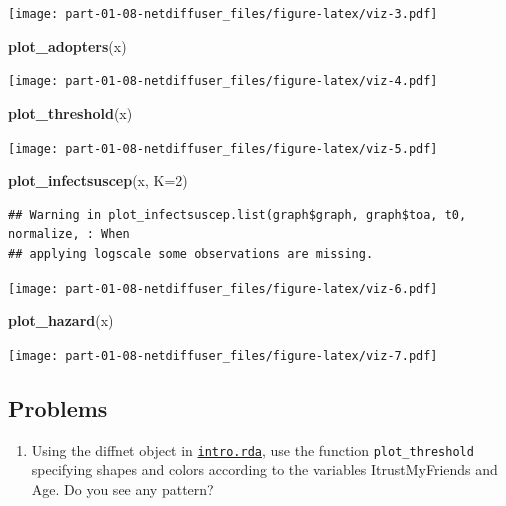 \documentclass[]{book}
\newenvironment{Shaded}{\begin{snugshade}}{\end{snugshade}}
\newcommand{\DataTypeTok}[1]{\textcolor[rgb]{0.13,0.29,0.53}{#1}}
\newcommand{\DecValTok}[1]{\textcolor[rgb]{0.00,0.00,0.81}{#1}}
\newcommand{\KeywordTok}[1]{\textcolor[rgb]{0.13,0.29,0.53}{\textbf{#1}}}
\newcommand{\NormalTok}[1]{#1}
\providecommand{\tightlist}{%
  \setlength{\itemsep}{0pt}\setlength{\parskip}{0pt}}
\begin{document}
\texttt{[image: part-01-08-netdiffuser\_files/figure-latex/viz-3.pdf]}

\begin{Shaded}
\begin{Highlighting}[]
\KeywordTok{plot_adopters}\NormalTok{(x)}
\end{Highlighting}
\end{Shaded}

\texttt{[image: part-01-08-netdiffuser\_files/figure-latex/viz-4.pdf]}

\begin{Shaded}
\begin{Highlighting}[]
\KeywordTok{plot_threshold}\NormalTok{(x)}
\end{Highlighting}
\end{Shaded}

\texttt{[image: part-01-08-netdiffuser\_files/figure-latex/viz-5.pdf]}

\begin{Shaded}
\begin{Highlighting}[]
\KeywordTok{plot_infectsuscep}\NormalTok{(x, }\DataTypeTok{K=}\DecValTok{2}\NormalTok{)}
\end{Highlighting}
\end{Shaded}

\begin{verbatim}
## Warning in plot_infectsuscep.list(graph$graph, graph$toa, t0, normalize, : When
## applying logscale some observations are missing.
\end{verbatim}

\texttt{[image: part-01-08-netdiffuser\_files/figure-latex/viz-6.pdf]}

\begin{Shaded}
\begin{Highlighting}[]
\KeywordTok{plot_hazard}\NormalTok{(x)}
\end{Highlighting}
\end{Shaded}

\texttt{[image: part-01-08-netdiffuser\_files/figure-latex/viz-7.pdf]}

\hypertarget{problems}{%
\subsection{Problems}\label{problems}}

\begin{enumerate}
\def\labelenumi{\arabic{enumi}.}
\tightlist
\item
  Using the diffnet object in \href{intro.rda}{\texttt{intro.rda}}, use the function \texttt{plot\_threshold} specifying
  shapes and colors according to the variables ItrustMyFriends and Age. Do you see any pattern?
\end{enumerate}
\end{document}
